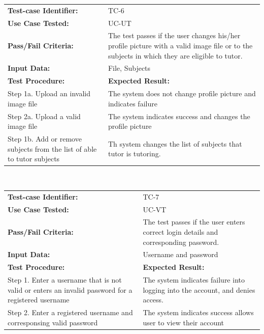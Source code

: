 \documentclass[12pt]{article}
\begin{document}
\begin{tabular}{| p{8cm} | p{8cm} |} \hline
	\textbf{Test-case Identifier:}& TC-6\\
	\textbf{Use Case Tested:}& UC-UT\\
	\textbf{Pass/Fail Criteria:}& The test passes if the user changes his/her profile picture with a valid image file or to the subjects in which they are eligible to tutor.\\
	\textbf{Input Data:}& File, Subjects\\\hline
	\textbf{Test Procedure:}& \textbf{Expected Result:} \\\hline
	Step 1a. Upload an invalid image file & The system does not change profile picture and indicates failure\\
	Step 2a. Upload a valid image file & The system indicates success and changes the profile picture\\
		Step 1b. Add or remove subjects from the list of able to tutor subjects & Th system changes the list of subjects that tutor is tutoring.  \\\hline
\end{tabular}
\\

\begin{tabular}{| p{8cm} | p{8cm} |} \hline
	\textbf{Test-case Identifier:}& TC-7\\
	\textbf{Use Case Tested:}& UC-VT\\
	\textbf{Pass/Fail Criteria:}& The test passes if the user enters correct login details and corresponding password.\\
	\textbf{Input Data:}& Username and password\\\hline
	\textbf{Test Procedure:}& \textbf{Expected Result:} \\\hline
	Step 1. Enter a username that is not valid or enters an invalid password for a registered username & The system indicates failure into logging into the account, and denies access. \\
	Step 2. Enter a registered username and corresponsing valid password  & The system indicates success allows user to view their account\\
		\hline
\end{tabular}
\\
\end{document}
